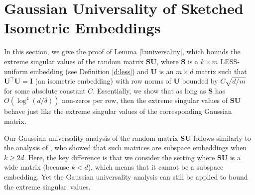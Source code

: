 \documentclass[11pt]{article}
\let\origtop\top
\renewcommand\top{{\scriptscriptstyle{\origtop}}}
\def\I{{\mathbf I}}
\def\S{{\mathbf S}}
\def\U{{\mathbf U}}
\begin{document}
\appendix

\section{Gaussian Universality of Sketched Isometric Embeddings}\label{sec:gauss-univ}
In this section, we give the proof of Lemma \ref{l:universality}, which bounds the extreme singular values of the random matrix $\S\U$, where $\S$ is a $k\times m$ LESS-uniform embedding (see Definition \ref{d:less}) and $\U$ is an $m\times d$ matrix such that $\U^\top\U=\I$ (an isometric embedding) with row norms of $\U$ bounded by $C\sqrt{d/m}$ for some absolute constant $C$. Essentially, we show that as long as $\S$ has $O(\log^4(d/\delta))$ non-zeros per row, then the extreme singular values of $\S\U$ behave just like the extreme singular values of the corresponding Gaussian matrix.


Our Gaussian universality analysis of the random matrix $\S\U$ follows similarly to the analysis of \cite{chenakkod2023optimal}, who showed that such matrices are subspace embeddings when $k\geq 2d$. Here, the key difference is that we consider the setting where $\S\U$ is a wide matrix (because $k<d$), which means that it cannot be a subspace embedding. Yet the Gaussian universality analysis can still be applied to bound the extreme singular~values. 
\end{document}
